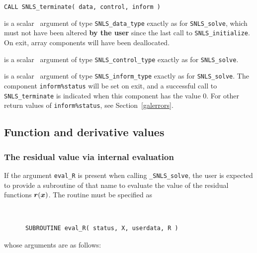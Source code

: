 \documentclass{galahad}
\newcommand{\packagename}{SNLS}
\newcommand{\fullpackagename}{\libraryname\_\packagename}
\newcommand{\solver}{{\tt \fullpackagename\_solve}}
\begin{document}
\hspace{8mm}
{\tt CALL \packagename\_terminate( data, control, inform )}

\vspace*{-1mm}
\begin{description}

 is a scalar \intentinout\ argument of type
{\tt \packagename\_data\_type}
exactly as for
{\tt \packagename\_solve},
which must not have been altered {\bf by the user} since the last call to
{\tt \packagename\_initialize}.
On exit, array components will have been deallocated.

 is a scalar \intentin\ argument of type
{\tt \packagename\_control\_type}
exactly as for
{\tt \packagename\_solve}.

 is a scalar \intentout\ argument of type
{\tt \packagename\_inform\_type}
exactly as for
{\tt \packagename\_solve}.
The component {\tt inform\%status} will be set on exit, and a
successful call to
{\tt \packagename\_terminate}
is indicated when this  component has the value 0.
For other return values of {\tt inform\%status}, see Section~\ref{galerrors}.

\end{description}


\subsection{Function and derivative values\label{fdv}}


\subsubsection{The residual value via internal evaluation\label{rfv}}

If the argument {\tt eval\_R} is present when calling \solver, the
user is expected to provide a subroutine of that name to evaluate the
value of the residual functions ${\bm{r}}({\bm{x}})$.
The routine must be specified as

\def\baselinestretch{0.8}
{\tt
\begin{verbatim}
      SUBROUTINE eval_R( status, X, userdata, R )
\end{verbatim}
}
\def\baselinestretch{1.0}
\noindent whose arguments are as follows:
\end{document}

